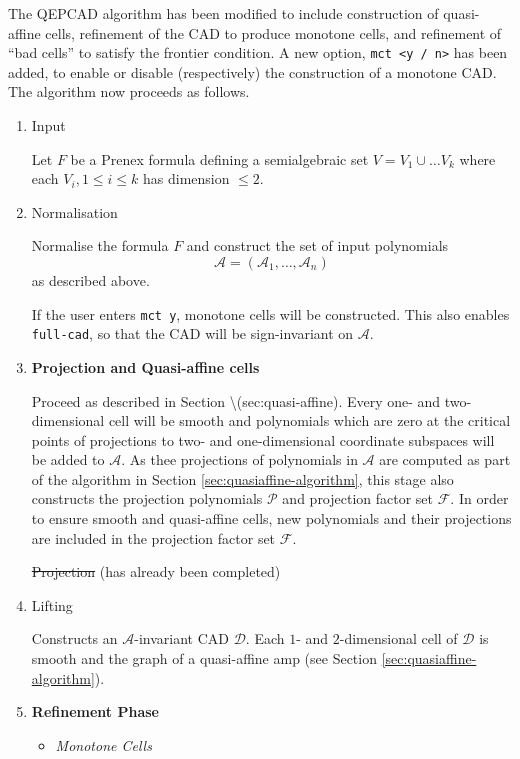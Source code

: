 \documentclass[
]{book}
\theoremstyle{definition}
\theoremstyle{definition}
\theoremstyle{definition}
\theoremstyle{definition}
\theoremstyle{remark}
\begin{document}
The QEPCAD algorithm has been modified to include construction of quasi-affine cells, refinement of the CAD to produce monotone cells, and refinement of ``bad cells'' to satisfy the frontier condition. A new option, \texttt{mct\ \textless{}y\ /\ n\textgreater{}} has been added, to enable or disable (respectively) the construction of a monotone CAD. The algorithm now proceeds as follows.

\begin{enumerate}
\def\labelenumi{\arabic{enumi}.}
\item
  Input

  Let \(F\) be a Prenex formula defining a semialgebraic set \(V = V_1 \cup \ldots V_k\) where each \(V_i, 1 \le i \le k\) has dimension \(\le 2\).
\item
  Normalisation

  Normalise the formula \(F\) and construct the set of input polynomials \[
  \mathcal{A} = (\mathcal{A}_1, \ldots,\mathcal{A}_n)
   \]
  as described above.

  If the user enters \texttt{mct\ y}, monotone cells will be constructed. This also enables \texttt{full-cad}, so that the CAD will be sign-invariant on \(\mathcal{A}\).
\item
  \textbf{Projection and Quasi-affine cells}

  Proceed as described in Section \textbackslash{}\citet{ref}(sec:quasi-affine). Every one- and two- dimensional cell will be smooth and polynomials which are zero at the critical points of projections to two- and one-dimensional coordinate subspaces will be added to \(\mathcal{A}\). As thee projections of polynomials in \(\mathcal{A}\) are computed as part of the algorithm in Section \ref{sec:quasiaffine-algorithm}, this stage also constructs the projection polynomials \(\mathcal{P}\) and projection factor set \(\mathcal{F}\). In order to ensure smooth and quasi-affine cells, new polynomials and their projections are included in the projection factor set \(\mathcal{F}\).

  \sout{Projection} (has already been completed)
\item
  Lifting

  Constructs an \(\mathcal{A}\)-invariant CAD \(\mathcal{D}\). Each \(1\)- and \(2\)-dimensional cell of \(\mathcal{D}\) is smooth and the graph of a quasi-affine amp (see Section \ref{sec:quasiaffine-algorithm}).
\item
  \textbf{Refinement Phase}

  \begin{itemize}
  \item
    \emph{Monotone Cells}


\end{itemize}
\end{enumerate}
\end{document}
